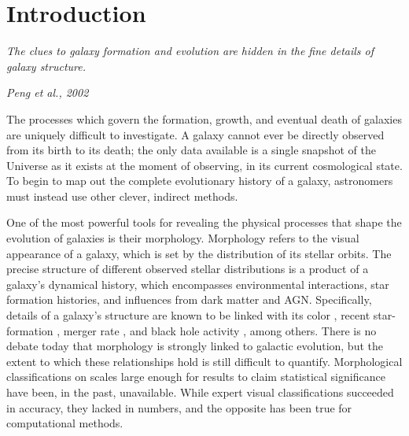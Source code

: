 \chapter{Introduction}
\label{chap:intro}
\epigraph{\textit{The clues to galaxy formation and evolution are hidden in the fine details of galaxy structure.}}{\textit{Peng et al., 2002}}

The processes which govern the formation, growth, and eventual death of galaxies are uniquely difficult to investigate. A galaxy cannot ever be directly observed from its birth to its death; the only data available is a single snapshot of the Universe as it exists at the moment of observing, in its current cosmological state. To begin to map out the complete evolutionary history of a galaxy, astronomers must instead use other clever, indirect methods.

One of the most powerful tools for revealing the physical processes that shape the evolution of galaxies is their morphology. Morphology refers to the visual appearance of a galaxy, which is set by the distribution of its stellar orbits. The precise structure of different observed stellar distributions is a product of a galaxy's dynamical history, which encompasses environmental interactions, star formation histories, and influences from dark matter and AGN. Specifically, details of a galaxy's structure are known to be linked with its color \citep{Tully1982,Strateva2001,Baldry2004}, recent star-formation \citep{Conselice2006,Martin2007,Mignoli2009}, merger rate \citep{Hammer2009,Oesch2010,Smethurst2017}, and black hole activity \citep{Athanassoula1992,Friedli1993,Schawinski2010}, among others. There is no debate today that morphology is strongly linked to galactic evolution, but the extent to which these relationships hold is still difficult to quantify. Morphological classifications on scales large enough for results to claim statistical significance have been, in the past, unavailable. While expert visual classifications succeeded in accuracy, they lacked in numbers, and the opposite has been true for computational methods. 

